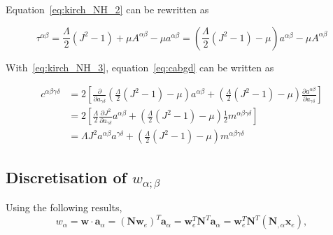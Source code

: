 \documentclass[../main.tex]{subfiles}
\begin{document}
\begin{appendices}
Equation~\eqref{eq:kirch_NH_2} can be rewritten as

\begin{equation}\label{eq:kirch_NH_3}
    \tau^{\alpha \beta} = \frac{\Lambda}{2} \left( J^{2} - 1 \right) + \mu A^{\alpha \beta} - \mu a^{\alpha \beta} = \left( \frac{\Lambda}{2} \left( J^{2} - 1 \right) - \mu \right) a^{\alpha \beta} - \mu A^{\alpha \beta} 
\end{equation}

With~\eqref{eq:kirch_NH_3}, equation~\eqref{eq:cabgd} can be written as

\begin{equation}\label{eq:cabgd_2}
    \begin{split}
        c^{\alpha \beta \gamma \delta} &= 2 \left[ \frac{\partial }{\partial a_{\gamma \delta}} \left( \frac{\Lambda}{2} \left( J^{2} - 1 \right) - \mu \right) a^{\alpha \beta} + \left( \frac{\Lambda}{2} \left( J^{2} - 1 \right) - \mu \right) \frac{\partial a^{\alpha \beta}}{\partial a_{\gamma \delta}} \right] \\ &= 2 \left[ \frac{\Lambda}{2} \frac{\partial J^{2}}{\partial a_{\gamma \delta}} a^{\alpha \beta} + \left( \frac{\Lambda}{2} \left( J^{2} - 1 \right) - \mu \right) \frac{1}{2} m^{\alpha \beta \gamma \delta} \right] \\ &= \Lambda J^{2} a^{\alpha \beta} a^{\gamma \delta} + \left( \frac{\Lambda}{2} \left( J^{2} - 1 \right) - \mu \right) m^{\alpha \beta \gamma \delta}
    \end{split}
\end{equation}
\subsection{Discretisation of \texorpdfstring{$w_{\alpha ; \beta}$}{w-a;b}}
Using the following results,
\begin{equation}\label{eq:w_alp}
        w_{\alpha} = \boldsymbol{w} \cdot \boldsymbol{a}_{\alpha} = \left( \mathbf{N} \mathbf{w}_{e} \right)^{T} \boldsymbol{a}_{\alpha} = \mathbf{w}_{e}^{T} \mathbf{N}^{T} \boldsymbol{a}_{\alpha} = \mathbf{w}_{e}^{T} \mathbf{N}^{T} \left( \mathbf{N}_{, \alpha} \mathbf{x}_{e} \right),
    \end{equation}


\end{appendices}
\end{document}
